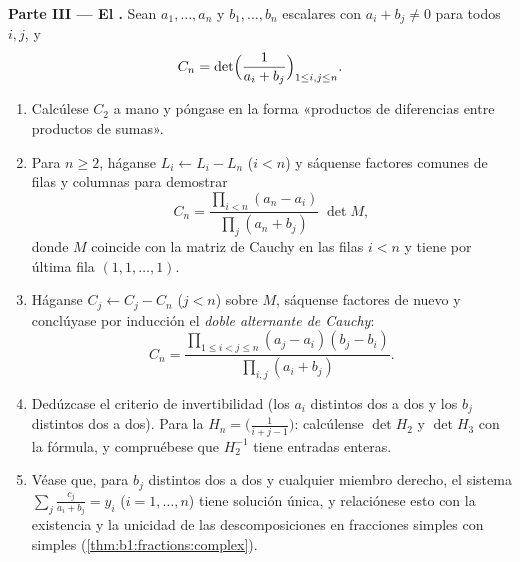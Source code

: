 \begin{problem}
\medskip
\noindent\textbf{Parte III --- El .} Sean
$a_1, \dots, a_n$ y $b_1, \dots, b_n$ escalares con
$a_i + b_j \neq 0$ para todos $i, j$, y
\[
C_n = \det\Bigl(\frac{1}{a_i + b_j}\Bigr)_{1 \leq i, j \leq n} .
\]
\begin{enumerate}[resume]
  \item Calcúlese $C_2$ a mano y póngase en la forma «productos de
        diferencias entre productos de sumas».
  \item Para $n \geq 2$, háganse $L_i \leftarrow L_i - L_n$
        ($i < n$) y sáquense factores comunes de filas y columnas
        para demostrar
        \[
        C_n = \frac{\prod_{i<n}(a_n - a_i)}{\prod_{j}(a_n +
        b_j)}\;\det M,
        \]
        donde $M$ coincide con la matriz de Cauchy en las filas
        $i < n$ y tiene por última fila $(1, 1, \dots, 1)$.
  \item Háganse $C_j \leftarrow C_j - C_n$ ($j < n$) sobre $M$,
        sáquense factores de nuevo y conclúyase por inducción el
        \emph{doble alternante de Cauchy}:
        \[
        C_n = \frac{\prod_{1 \leq i < j \leq n}(a_j - a_i)(b_j -
        b_i)}{\prod_{i, j}(a_i + b_j)} .
        \]
  \item Dedúzcase el criterio de invertibilidad (los $a_i$
        distintos dos a dos y los $b_j$ distintos dos a dos). Para
        la \emph{}
        $H_n = \bigl(\frac{1}{i + j - 1}\bigr)$: calcúlense
        $\det H_2$ y $\det H_3$ con la fórmula, y compruébese que
        $H_2^{-1}$ tiene entradas enteras.
  \item Véase que, para $b_j$ distintos dos a dos y cualquier
        miembro derecho, el sistema
        $\sum_j \frac{c_j}{a_i + b_j} = y_i$ ($i = 1, \dots, n$)
        tiene solución única, y relaciónese esto con la existencia y
        la unicidad de las descomposiciones en fracciones simples
        con  simples (\cref{thm:b1:fractions:complex}).
\end{enumerate}


\end{problem}
